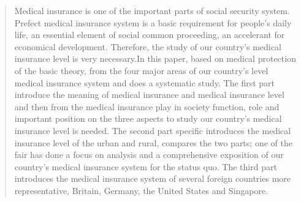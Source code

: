 

\begin{abstract}

Medical insurance is one of the important parts of social security system. Prefect medical insurance system is a basic requirement for people’s daily life, an essential element of social common proceeding, an accelerant for economical development. Therefore, the study of our country’s medical insurance level is very necessary.In this paper, based on medical protection of the basic theory, from the four major areas of our country’s level medical insurance system and does a systematic study. The first part introduce the meaning of medical insurance and medical insurance level and then from the medical insurance play in society function, role and important position on the three aspects to study our country's medical insurance level is needed. The second part specific introduces the medical insurance level of the urban and rural, compares the two parts; one of the fair has done a focus on analysis and a comprehensive exposition of our country's medical insurance system for the status quo. The third part introduces the medical insurance system of several foreign countries more representative, Britain, Germany, the United States and Singapore.


\end{abstract}%
